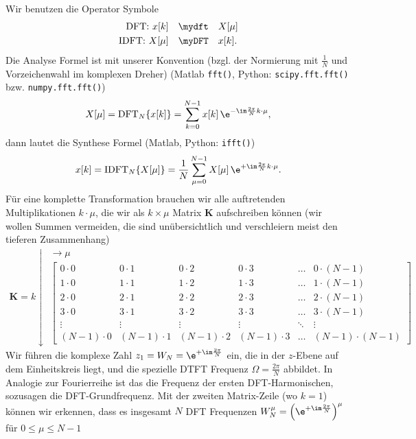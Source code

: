 Wir benutzen die Operator Symbole
\begin{align}
\text{DFT: }x[k] &\quad\mydft\quad X[\mu]\\
\text{IDFT: }X[\mu] &\quad\myDFT\quad x[k].
\end{align}
%
Die Analyse Formel ist mit unserer Konvention
(bzgl. der Normierung mit $\frac{1}{N}$ und Vorzeichenwahl im komplexen Dreher)
(Matlab \texttt{fft()}, Python: \texttt{scipy.fft.fft()} bzw. \texttt{numpy.fft.fft()})
\begin{align}
X[\mu] = \mathrm{DFT}_N\{x[k]\} = \sum_{k=0}^{N-1} x[k] \, \e^{-\im\frac{2\pi}{N} k \cdot \mu},
\end{align}
dann lautet die Synthese Formel (Matlab, Python: \texttt{ifft()})
\begin{align}
x[k] = \mathrm{IDFT}_N\{X[\mu]\} = \frac{1}{N} \sum_{\mu=0}^{N-1} X[\mu] \, \e^{+\im\frac{2\pi}{N} k \cdot \mu}.
\end{align}
%
Für eine komplette Transformation brauchen wir alle auftretenden Multiplikationen $k \cdot \mu$,
die wir als $k \times \mu$ Matrix $\bm{K}$ aufschreiben können (wir wollen Summen vermeiden,
die sind unübersichtlich und verschleiern meist den tieferen Zusammenhang)
\begin{align}
\bm{K} =
k \downarrow
\substack{\rightarrow \mu\\
\begin{bmatrix}
0 \cdot 0 & 0 \cdot 1 & 0 \cdot 2 & 0 \cdot 3 & \dots & 0 \cdot (N-1)\\
1 \cdot 0 & 1 \cdot 1 & 1 \cdot 2 & 1 \cdot 3 & \dots & 1 \cdot (N-1)\\
2 \cdot 0 & 2 \cdot 1 & 2 \cdot 2 & 2 \cdot 3 & \dots & 2 \cdot (N-1)\\
3 \cdot 0 & 3 \cdot 1 & 3 \cdot 2 & 3 \cdot 3 & \dots & 3 \cdot (N-1)\\
\vdots & \vdots & \vdots & \vdots & \ddots & \vdots\\
(N-1) \cdot 0 & (N-1) \cdot 1 & (N-1) \cdot 2 & (N-1) \cdot 3 & \dots &  (N-1) \cdot (N-1)
\end{bmatrix}
}
\end{align}
Wir führen die komplexe Zahl $z_1 = W_N = \e^{+\im\frac{2\pi}{N}}$ ein, die
in der $z$-Ebene auf dem Einheitskreis liegt, und die spezielle DTFT
Frequenz $\Omega = \frac{2\pi}{N}$ abbildet. In Analogie zur Fourierreihe ist
das die Frequenz der ersten DFT-Harmonischen, sozusagen die DFT-Grundfrequenz.
Mit der zweiten Matrix-Zeile (wo $k=1$) können wir erkennen,
dass es insgesamt $N$ DFT Frequenzen
$W_N^\mu=\left(\e^{+\im\frac{2\pi}{N}}\right)^\mu$ für $0\leq\mu\leq N-1$
